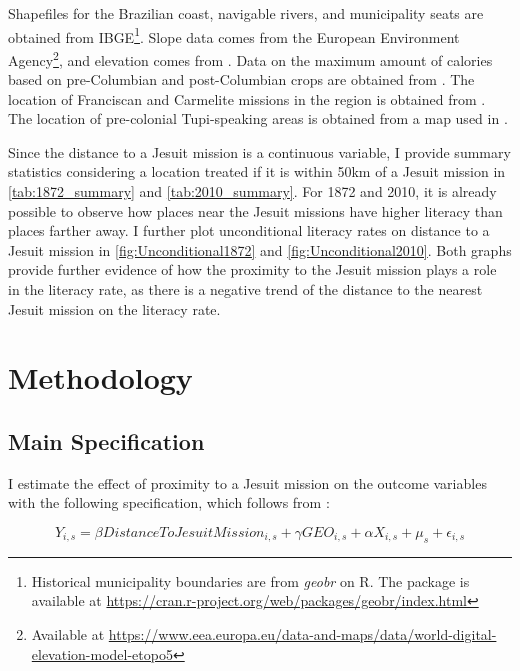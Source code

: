\documentclass{article}
\begin{document}
Shapefiles for the  Brazilian coast, navigable rivers, and municipality seats are obtained from IBGE\footnote{
  Historical municipality boundaries are from \textit{geobr} on R. The package is available at \url{https://cran.r-project.org/web/packages/geobr/index.html}}. 
Slope data comes from the European Environment Agency\footnote{
  Available at \url{https://www.eea.europa.eu/data-and-maps/data/world-digital-elevation-model-etopo5}}, and elevation comes from \textcite{Amatulli2018-gl}. 
Data on the maximum amount of calories based on pre-Columbian and post-Columbian crops are obtained from \textcite{Galor2016-ba}. 
The location of Franciscan and Carmelite missions in the region is obtained from \textcite{Bombardi2014-jf}. 
The location of pre-colonial Tupi-speaking areas is obtained from a map used in \textcite{Clement2015-rf, Eriksen2011-cv}.

Since the distance to a Jesuit mission is a continuous variable, I provide summary statistics considering a location treated if it is within 50km of a Jesuit mission in \autoref{tab:1872_summary} and \autoref{tab:2010_summary}. 
For 1872 and 2010, it is already possible to observe how places near the Jesuit missions have higher literacy than places farther away. 
I further plot unconditional literacy rates on distance to a Jesuit mission in \autoref{fig:Unconditional1872} and \autoref{fig:Unconditional2010}. 
Both graphs provide further evidence of how the proximity to the Jesuit mission plays a role in the literacy rate, as there is a negative trend of the distance to the nearest Jesuit mission on the literacy rate.

\section{Methodology}

\subsection{Main Specification}

I estimate the effect of proximity to a Jesuit mission on the outcome variables with the following specification, which follows from \textcite{Valencia_Caicedo2018-gp}:

\begin{equation}
\label{eqn:mainreg}
	Y_{i,s} = \beta \textit{DistanceToJesuitMission}_{i,s} + \gamma \textit{GEO}_{i,s} +  \alpha \textit{X}_{i,s} + \mu_s + \epsilon_{i,s}
\end{equation}
\end{document}
